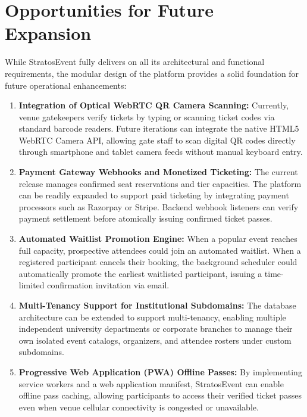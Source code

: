 \documentclass[11pt,a4paper]{report}
\begin{document}
\section{Opportunities for Future Expansion}
\justifying
While StratosEvent fully delivers on all its architectural and functional requirements, the modular design of the platform provides a solid foundation for future operational enhancements:

\begin{enumerate}[leftmargin=1.5em, itemsep=0.6em]
    \item \textbf{Integration of Optical WebRTC QR Camera Scanning:}
    Currently, venue gatekeepers verify tickets by typing or scanning ticket codes via standard barcode readers. Future iterations can integrate the native HTML5 WebRTC Camera API, allowing gate staff to scan digital QR codes directly through smartphone and tablet camera feeds without manual keyboard entry.

    \item \textbf{Payment Gateway Webhooks and Monetized Ticketing:}
    The current release manages confirmed seat reservations and tier capacities. The platform can be readily expanded to support paid ticketing by integrating payment processors such as Razorpay or Stripe. Backend webhook listeners can verify payment settlement before atomically issuing confirmed ticket passes.

    \item \textbf{Automated Waitlist Promotion Engine:}
    When a popular event reaches full capacity, prospective attendees could join an automated waitlist. When a registered participant cancels their booking, the background scheduler could automatically promote the earliest waitlisted participant, issuing a time-limited confirmation invitation via email.

    \item \textbf{Multi-Tenancy Support for Institutional Subdomains:}
    The database architecture can be extended to support multi-tenancy, enabling multiple independent university departments or corporate branches to manage their own isolated event catalogs, organizers, and attendee rosters under custom subdomains.

    \item \textbf{Progressive Web Application (PWA) Offline Passes:}
    By implementing service workers and a web application manifest, StratosEvent can enable offline pass caching, allowing participants to access their verified ticket passes even when venue cellular connectivity is congested or unavailable.
\end{enumerate}
\end{document}
